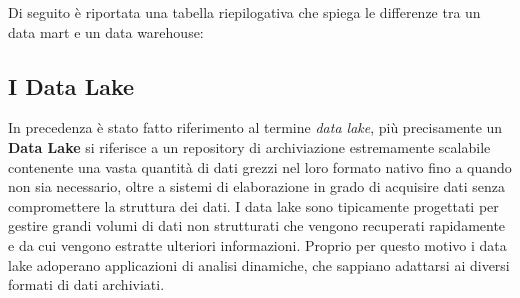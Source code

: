 Di seguito è riportata una tabella riepilogativa che spiega le differenze tra un data mart e un data warehouse:\cite{streamsets_data_mart_vs_data_warehouse}

\subsection{I Data Lake}

In precedenza è stato fatto riferimento al termine \textit{data lake}, più precisamente un \textbf{Data Lake} si riferisce a un repository di archiviazione estremamente scalabile contenente una vasta quantità di dati grezzi nel loro formato nativo fino a quando non sia necessario, oltre a sistemi di elaborazione in grado di acquisire dati senza compromettere la struttura dei dati. I data lake sono tipicamente progettati per gestire grandi volumi di dati non strutturati che vengono recuperati rapidamente e da cui vengono estratte ulteriori informazioni. Proprio per questo motivo i data lake adoperano applicazioni di analisi dinamiche, che sappiano adattarsi ai diversi formati di dati archiviati.\cite{sciencedirect_data_lake}

